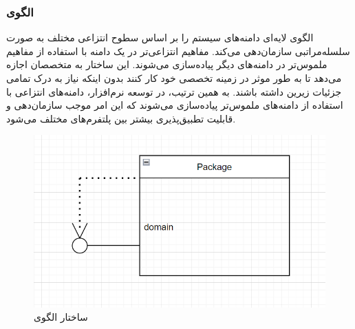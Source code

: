 \subsubsection{الگوی }
\label{archLayerSec}
\begin{RTL}
الگوی لایه‌ای \cite{ref4} دامنه‌های سیستم را بر اساس سطوح انتزاعی
مختلف به صورت سلسله‌مراتبی
سازمان‌دهی می‌کند. مفاهیم انتزاعی‌تر در یک دامنه با استفاده
از مفاهیم ملموس‌تر در دامنه‌های دیگر پیاده‌سازی می‌شوند.
این ساختار به متخصصان اجازه می‌دهد تا به طور موثر در زمینه تخصصی
خود کار کنند بدون اینکه نیاز به درک تمامی جزئیات زیرین
داشته باشند. به همین ترتیب، در توسعه نرم‌افزار،
دامنه‌های انتزاعی با استفاده از دامنه‌های ملموس‌تر پیاده‌سازی
می‌شوند که این امر موجب سازمان‌دهی و قابلیت تطبیق‌پذیری بیشتر بین
پلتفرم‌های مختلف می‌شود.
\end{RTL}
\begin{figure}[h!]
\centering
\includegraphics[scale=0.5]{images/first/layer.png}
\caption{ساختار الگوی }
\end{figure}
